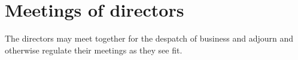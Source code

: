 \section{Meetings of directors}

The directors may meet together for the despatch of business and adjourn and otherwise regulate their meetings as they see fit. 